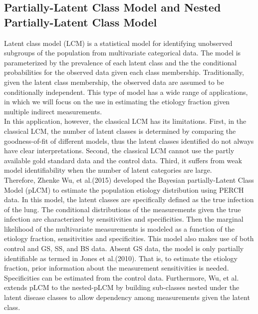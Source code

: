 \documentclass[11 pt, a4paper]{article}  %
\begin{document}
\subsection{Partially-Latent Class Model and Nested Partially-Latent Class Model}
Latent class model (LCM) \cite{goodman1974exploratory} is a statistical model for identifying unobserved subgroups of the population from multivariate categorical data. The model is parameterized by the prevalence of each latent class and the the conditional probabilities for the observed data given each class membership. Traditionally, given the latent class membership, the observed data are assumed to be conditionally independent. This type of model has a wide range of applications\cite{rindskopf2002use, albert2001latent}, in which we will focus on the use in estimating the etiology fraction given multiple indirect measurements.\\

In this application, however, the classical LCM has its limitations. First, in the classical LCM, the number of latent classes is determined by comparing the goodness-of-fit of different models, thus the latent classes identified do not always have clear interpretations. Second, the classical LCM cannot use the partly available gold standard data and the control data. Third, it suffers from weak model identifiability \cite{goodman1974exploratory} when the number of latent categories are large.\\

Therefore, Zhenke Wu, et al.(2015) developed the Bayesian partially-Latent Class Model (pLCM) \cite{wu2015partially} to estimate the population etiology distribution using PERCH data. In this model, the latent classes are specifically defined as the true infection of the lung. The conditional distributions of the measurements given the true infection are characterized by sensitivities and specificities. Then the marginal likelihood of the multivariate measurements is modeled as a function of the etiology fraction, sensitivities and specificities. This model also makes use of both control and GS, SS, and BS data. Absent GS data, the model is only partially identifiable \cite{jones2010identifiability} as termed in Jones et al.(2010). That is, to estimate the etiology fraction, prior information about the measurement sensitivities is needed. Specificities can be estimated from the control data. Furthermore, Wu, et al. extends pLCM to the nested-pLCM \cite{wu2015nested} by building sub-classes nested under the latent disease classes to allow dependency among measurements given the latent class.\\
\end{document}
